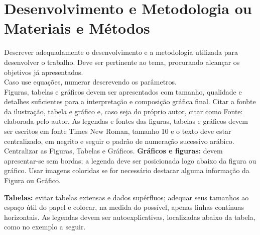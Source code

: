\documentclass[a0,portrait]{a0poster}
\begin{document}
\begin{multicols}{2}
\begin{itemize}
\end{itemize}



\section*{Desenvolvimento e Metodologia ou Materiais e M\'etodos}
\vspace{-1cm}
Descrever adequadamente o desenvolvimento e a metodologia utilizada para desenvolver o trabalho. Deve ser pertinente ao tema, procurando alcan\c car os objetivos j\'a apresentados.\\
Caso use equa\c c\~oes, numerar descrevendo os par\^ametros.\\
 Figuras, tabelas e gr\'aficos devem ser apresentados com tamanho, qualidade e detalhes suficientes para a interpreta\c c\~ao e composi\c c\~ao gr\'afica final. 
Citar a fonbte da ilustra\c c\~ao, tabela e gr\'afico e, caso seja do pr\'oprio autor, citar como Fonte: elaborada pelo autor.
As legendas e fontes das figuras, tabelas e gr\'aficos devem ser escritos em fonte Times New Roman, tamanho 10 e o texto deve estar centralizado, em negrito e seguir o padr\~ao de numera\c c\~ao sucessivo ar\'abico. Centralizar as Figuras, Tabelas e Gr\'aficos.
\textbf{Gr\'aficos e figuras:} devem apresentar-se sem bordas; a legenda deve ser posicionada logo abaixo da figura ou gr\'afico. Usar imagens coloridas se for necess\'ario destacar alguma informa\c c\~ao da Figura ou Gr\'afico.

 
\textbf{Tabelas:} evitar tabelas extensas e dados sup\'erfluos; adequar seus tamanhos ao espa\c co \'util do papel e colocar, na medida do poss\'i­vel, apenas linhas cont\'i­nuas horizontais. As legendas devem ser autoexplicativas, localizadas abaixo da tabela, como no exemplo a seguir. 


\end{multicols}
\end{document}
